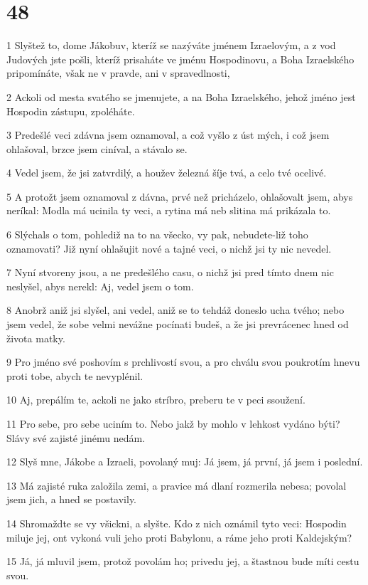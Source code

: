\chapter{48}

\par 1 Slyštež to, dome Jákobuv, kteríž se nazýváte jménem Izraelovým, a z vod Judových jste pošli, kteríž prisaháte ve jménu Hospodinovu, a Boha Izraelského pripomínáte, však ne v pravde, ani v spravedlnosti,
\par 2 Ackoli od mesta svatého se jmenujete, a na Boha Izraelského, jehož jméno jest Hospodin zástupu, zpoléháte.
\par 3 Predešlé veci zdávna jsem oznamoval, a což vyšlo z úst mých, i což jsem ohlašoval, brzce jsem ciníval, a stávalo se.
\par 4 Vedel jsem, že jsi zatvrdilý, a houžev železná šíje tvá, a celo tvé ocelivé.
\par 5 A protožt jsem oznamoval z dávna, prvé než pricházelo, ohlašovalt jsem, abys neríkal: Modla má ucinila ty veci, a rytina má neb slitina má prikázala to.
\par 6 Slýchals o tom, pohlediž na to na všecko, vy pak, nebudete-liž toho oznamovati? Již nyní ohlašujit nové a tajné veci, o nichž jsi ty nic nevedel.
\par 7 Nyní stvoreny jsou, a ne predešlého casu, o nichž jsi pred tímto dnem nic neslyšel, abys nerekl: Aj, vedel jsem o tom.
\par 8 Anobrž aniž jsi slyšel, ani vedel, aniž se to tehdáž doneslo ucha tvého; nebo jsem vedel, že sobe velmi nevážne pocínati budeš, a že jsi prevrácenec hned od života matky.
\par 9 Pro jméno své poshovím s prchlivostí svou, a pro chválu svou poukrotím hnevu proti tobe, abych te nevyplénil.
\par 10 Aj, prepálím te, ackoli ne jako stríbro, preberu te v peci ssoužení.
\par 11 Pro sebe, pro sebe uciním to. Nebo jakž by mohlo v lehkost vydáno býti? Slávy své zajisté jinému nedám.
\par 12 Slyš mne, Jákobe a Izraeli, povolaný muj: Já jsem, já první, já jsem i poslední.
\par 13 Má zajisté ruka založila zemi, a pravice má dlaní rozmerila nebesa; povolal jsem jich, a hned se postavily.
\par 14 Shromaždte se vy všickni, a slyšte. Kdo z nich oznámil tyto veci: Hospodin miluje jej, ont vykoná vuli jeho proti Babylonu, a ráme jeho proti Kaldejským?
\par 15 Já, já mluvil jsem, protož povolám ho; privedu jej, a štastnou bude míti cestu svou.
